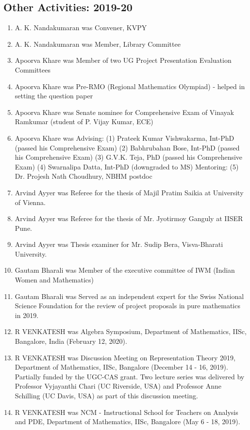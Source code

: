 \subsection{Other Activities: 2019-20}
\begin{enumerate}
\item A. K. Nandakumaran was Convener, KVPY
\item A. K. Nandakumaran was Member, Library Committee
\item Apoorva Khare was Member of two UG Project Presentation Evaluation Committees
\item Apoorva Khare was Pre-RMO (Regional Mathematics Olympiad) - helped in setting the question paper
\item Apoorva Khare was Senate nominee for Comprehensive Exam of Vinayak Ramkumar (student of P. Vijay Kumar, ECE)
\item Apoorva Khare was Advising: (1) Prateek Kumar Vishwakarma, Int-PhD (passed his Comprehensive Exam) (2) Babhrubahan Bose, Int-PhD (passed his Comprehensive Exam) (3) G.V.K. Teja, PhD (passed his Comprehensive Exam) (4) Swarnalipa Datta, Int-PhD (downgraded to MS) Mentoring: (5) Dr. Projesh Nath Choudhury, NBHM postdoc
\item Arvind Ayyer was Referee for the thesis of Majil Pratim Saikia at University of Vienna.
\item Arvind Ayyer was Referee for the thesis of Mr. Jyotirmoy Ganguly at IISER Pune.
\item Arvind Ayyer was Thesis examiner for Mr. Sudip Bera, Visva-Bharati University.
\item Gautam Bharali was Member of the executive committee of IWM (Indian Women and Mathematics)
\item Gautam Bharali was Served as an independent expert for the Swiss National Science Foundation for the review of project proposals in pure mathematics in 2019.
\item R VENKATESH was Algebra Symposium, Department of Mathematics, IISc, Bangalore, India (February 12, 2020).
\item R VENKATESH was Discussion Meeting on Representation Theory 2019, Department of Mathematics, IISc, Bangalore (December 14 - 16, 2019). Partially funded by the UGC-CAS grant.  Two lecture series was delivered by Professor Vyjayanthi Chari (UC Riverside, USA) and Professor Anne Schilling (UC Davis, USA) as part of this discussion meeting. 
\item R VENKATESH was NCM - Instructional School for Teachers on Analysis and PDE, Department of Mathematics, IISc, Bangalore (May 6 - 18, 2019). 

\end{enumerate}
